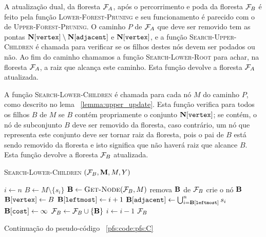 A atualização dual, da floresta $\mathcal{F}_A$, após o percorrimento e 
poda da floresta $\mathcal{F}_B$ é feito pela função 
\textsc{Lower-Forest-Pruning} e seu funcionamento é parecido com o de
\textsc{Upper-Forest-Pruning}. O caminho $P$ de $\mathcal{F}_A$ que deve 
ser removido tem as pontas 
$\mathbf N[\texttt{vertex}] \setminus \mathbf N[\texttt{adjacent}]$
e $\mathbf N[\texttt{vertex}]$, e a função 
\textsc{Search-Upper-Children} é chamada para verificar se os filhos 
destes nós devem ser podados ou não. Ao fim do caminho chamamos a função 
\textsc{Search-Lower-Root} para achar, na floresta $\mathcal{F}_A$, a raiz
que alcança este caminho. Esta função devolve a floresta $\mathcal{F}_A$
atualizada.

\newpage
A função \textsc{Search-Lower-Children} é chamada para cada nó $M$ do 
caminho $P$, como descrito no lema ~\ref{lemma:upper_update}. Esta 
função verifica para todos os filhos $B$ de $M$ se $B$ contém 
propriamente o conjunto $\mathbf N[\texttt{vertex}]$; se contém, o 
nó de subconjunto $B$ deve ser removido da floresta, caso 
contrário, um nó que representa este conjunto deve ser tornar raiz da 
floresta, pois o pai de $B$ está sendo removido da floresta e isto 
significa que não haverá raiz que alcance $B$. Esta função
devolve a floresta $\mathcal{F}_B$ atualizada.

\begin{algorithm}[H]
\textsc{Search-Lower-Children} $(\mathcal{F}_B, \mathbf M, M, Y)$
\begin{algorithmic}[1]
    \State $i \gets n$
        \State $B \gets M \setminus \{s_i\}$
            \State $\mathbf B \gets {\normalfont\textsc{Get-Node}} (\mathcal{F}_B, M)$
                \State remova $\mathbf B$ de $\mathcal{F}_B$
            \EndIf
        \Else
            \State crie o nó $\mathbf B$
            \State $\mathbf B[\texttt{vertex}] \gets B$
            \State $\mathbf B[\texttt{leftmost}] \gets i + 1$
            \State $\mathbf B[\texttt{adjacent}] \gets \bigcup_{i=\mathbf B[\texttt{leftmost}]}^{n} s_i$
            \State $\mathbf B[\texttt{cost}] \gets \infty$
            \State $\mathcal{F}_B \gets \mathcal{F}_B \cup \{\mathbf B\}$ 
        \EndIf
        \State $i \gets i - 1$
        \Return $\mathcal{F}_B$
    \EndWhile
\end{algorithmic}
\caption{Continuação do pseudo-código ~\ref{pfs:code:pfs:C}}
\label{pfs:code:pfs:D}
\end{algorithm}


